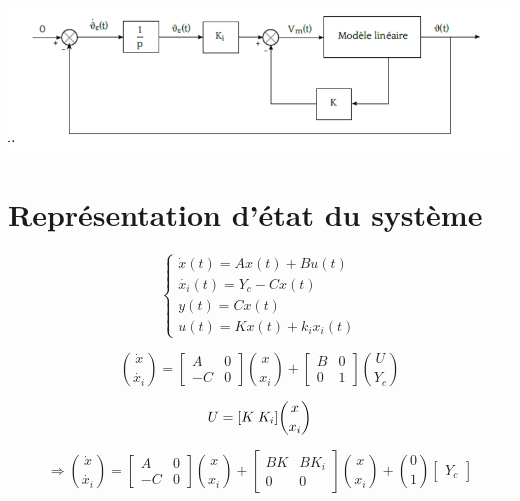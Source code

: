 \documentclass[12pt, a4paper, openany]{report}
\begin{document}
\begin{center}
\includegraphics[scale=0.5]{fig11.png} 
\label{fiig11}
\end{center}   

    \section{Représentation d'état du système} 
     
     \begin{equation*}
    \left\{\begin{matrix}
    \dot{x}(t)=Ax(t)+Bu(t)\\ 
    \dot{x_{i}}(t)=Y_{c}-Cx(t)\\
    y(t)=Cx(t)\\
    u(t)=Kx(t)+k_{i}x_{i}(t)
    \end{matrix}\right.
    \end{equation*}
    
    \begin{equation}
    \binom{\dot{x}}{\dot{x_{i}}}=\begin{bmatrix}
    A & 0\\ 
    -C & 0 
    \end{bmatrix}\binom{x}{x_{i}}+\begin{bmatrix}
    B &0 \\ 
    0 & 1
    \end{bmatrix}\binom{U}{Y_{c}}
    \end{equation}
    
    \begin{equation*}
    U=[K  \; K_{i}] \binom{x}{x_{i}}\\
\end{equation*}


\begin{equation*}
\Rightarrow\binom{\dot{x}}{\dot{x_{i}}}=\begin{bmatrix}
A & 0\\ 
-C & 0 
\end{bmatrix}\binom{x}{x_{i}}+\begin{bmatrix}
BK & BK_{i}\\ 
 0& 0
\end{bmatrix}\binom{x}{x_{i}}+ \binom{0}{1}\begin{bmatrix}
Y_{c}
\end{bmatrix}
\end{equation*}
\end{document}
